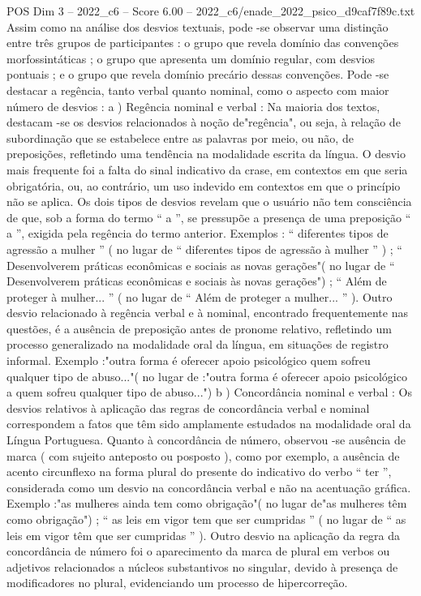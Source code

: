 \begin{textsample}{POS Dim 3 – 2022\_c6 – Score 6.00 – 2022\_c6/enade\_2022\_psico\_d9caf7f89c.txt}
Assim como na análise dos desvios textuais, pode -se observar uma distinção entre três grupos de participantes : o grupo que revela domínio das convenções morfossintáticas ; o grupo que apresenta um domínio regular, com desvios pontuais ; e o grupo que revela domínio precário dessas convenções.
Pode -se destacar a regência, tanto verbal quanto nominal, como o aspecto com maior número de desvios : a ) Regência nominal e verbal : Na maioria dos textos, destacam -se os desvios relacionados à noção de"regência", ou seja, à relação de subordinação que se estabelece entre as palavras por meio, ou não, de preposições, refletindo uma tendência na modalidade escrita da língua.
O desvio mais frequente foi a falta do sinal indicativo da crase, em contextos em que seria obrigatória, ou, ao contrário, um uso indevido em contextos em que o princípio não se aplica.
Os dois tipos de desvios revelam que o usuário não tem consciência de que, sob a forma do termo “ a ”, se pressupõe a presença de uma preposição “ a ”, exigida pela regência do termo anterior.
Exemplos : “ diferentes tipos de agressão a mulher ” ( no lugar de “ diferentes tipos de agressão à mulher ” ) ; “ Desenvolverem práticas econômicas e sociais as novas gerações"( no lugar de “ Desenvolverem práticas econômicas e sociais às novas gerações") ; “ Além de proteger à mulher... ” ( no lugar de “ Além de proteger a mulher... ” ).
Outro desvio relacionado à regência verbal e à nominal, encontrado frequentemente nas questões, é a ausência de preposição antes de pronome relativo, refletindo um processo generalizado na modalidade oral da língua, em situações de registro informal.
Exemplo :"outra forma é oferecer apoio psicológico quem sofreu qualquer tipo de abuso..."( no lugar de :"outra forma é oferecer apoio psicológico a quem sofreu qualquer tipo de abuso...") b ) Concordância nominal e verbal : Os desvios relativos à aplicação das regras de concordância verbal e nominal correspondem a fatos que têm sido amplamente estudados na modalidade oral da Língua Portuguesa.
Quanto à concordância de número, observou -se ausência de marca ( com sujeito anteposto ou posposto ), como por exemplo, a ausência de acento circunflexo na forma plural do presente do indicativo do verbo “ ter ”, considerada como um desvio na concordância verbal e não na acentuação gráfica.
Exemplo :"as mulheres ainda tem como obrigação"( no lugar de"as mulheres têm como obrigação") ; “ as leis em vigor tem que ser cumpridas ” ( no lugar de “ as leis em vigor têm que ser cumpridas ” ).
Outro desvio na aplicação da regra da concordância de número foi o aparecimento da marca de plural em verbos ou adjetivos relacionados a núcleos substantivos no singular, devido à presença de modificadores no plural, evidenciando um processo de hipercorreção.

\end{textsample}

